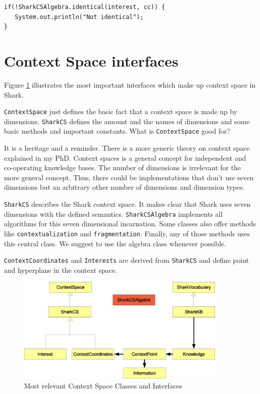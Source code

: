 \begin{verbatim}
if(!SharkCSAlgebra.identical(interest, cc)) {
   System.out.println("Not identical");
}
\end{verbatim}

\section{Context Space interfaces}
Figure \ref{fig:contextSpaceHierarchy} illustrates the most important interfaces which make up context space in Shark.

{\tt ContextSpace} just defines the basic fact that a context space is made up by dimensions. {\tt SharkCS} defines the amount and the names of dimensions and some basic methods and important constants. What is {\tt ContextSpace} good for?

It is a heritage and a reminder. There is a more generic theory on context space explained in my PhD. Context spaces is a general concept for independent and co-operating knowledge bases. The number of dimensions is irrelevant for the more general concept. Thus, there could be implementations that don't use seven dimensions but an arbitrary other number of dimensions and dimension types.

{\tt SharkCS} describes the Shark context space. It makes clear that Shark uses seven dimensions with the defined semantics. {\tt SharkCSAlgebra} implements all algorithms for this seven dimensional incarnation. Some classes also offer methods like {\tt contextualization} and {\tt fragmentation}. Finally, any of those methods uses this central class. We suggest to use the algebra class whenever possible.

{\tt ContextCoordinates} and {\tt Interests} are derived from {\tt SharkCS} and define point and hyperplane in the context space.

\begin{figure}[t]
\centering
\includegraphics[width=0.90\textwidth]{CSInterfaces.eps}
\caption{Most relevant Context Space Classes and Interfaces}
\label{fig:contextSpaceHierarchy}
\end{figure}

